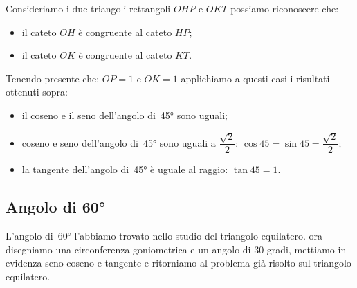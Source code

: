  \begin{minipage}{.45\textwidth}
  \begin{center}
\begin{inaccessibleblock}
    
\end{inaccessibleblock}
  \end{center}
 \end{minipage}
 \begin{minipage}{.45\textwidth}
Consideriamo i due triangoli rettangoli \(OHP\) e \(OKT\) possiamo riconoscere 
che:
\begin{itemize} [noitemsep]
 \item il cateto \(OH\) è congruente al cateto \(HP\); 
 \item il cateto \(OK\) è congruente al cateto \(KT\).\\
\end{itemize}
 \end{minipage}
 
Tenendo presente che: \(OP=1\) e \(OK=1\) applichiamo a questi casi i risultati 
ottenuti sopra:
\begin{itemize} [noitemsep]
 \item il coseno e il seno dell'angolo di~45° sono uguali;
 \item coseno e seno dell'angolo di~45° sono uguali a 
 \(\dfrac{\sqrt{2}}{2}\): 
  \(\cos 45 = \sin 45 = \dfrac{\sqrt{2}}{2}\); 
 \item la tangente dell'angolo di~45° è uguale al raggio: 
  \(\tan 45 = 1\).
\end{itemize}

\subsection{Angolo di 60°}

L'angolo di~60° l'abbiamo trovato nello studio del triangolo equilatero. ora 
disegniamo una circonferenza goniometrica e un angolo di 30 gradi, mettiamo 
in 
evidenza seno coseno e tangente e ritorniamo al problema già risolto sul 
triangolo equilatero.\\

